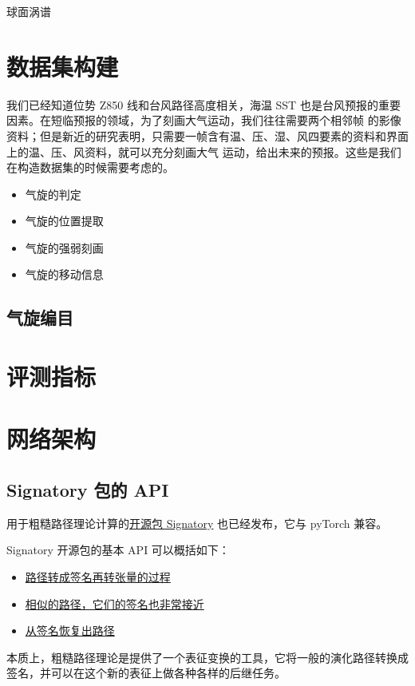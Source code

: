 \documentclass[11pt]{article}
\begin{document}
球面涡谱

\newpage

\section{数据集构建}

我们已经知道位势 Z850 线和台风路径高度相关，海温 SST 也是台风预报的重要因素。在短临预报的领域，为了刻画大气运动，我们往往需要两个相邻帧
的影像资料；但是新近的研究表明\cite{Bi2022Pangu}，只需要一帧含有温、压、湿、风四要素的资料和界面上的温、压、风资料，就可以充分刻画大气
运动，给出未来的预报。这些是我们在构造数据集的时候需要考虑的。

\begin{itemize}
    \item 气旋的判定
    \item 气旋的位置提取
    \item 气旋的强弱刻画
    \item 气旋的移动信息
\end{itemize}


\subsection{气旋编目}

\newpage

\section{评测指标}

\newpage

\section{网络架构}

\subsection{Signatory 包的 API}

用于粗糙路径理论计算的\href{https://github.com/patrick-kidger/signatory}{开源包 Signatory} 也已经发布，它与 pyTorch 兼容。

Signatory 开源包的基本 API 可以概括如下：
\begin{itemize}
\item \href{https://signatory.readthedocs.io/en/latest/pages/examples/neuralnetworks.html}{路径转成签名再转张量的过程}
\item \href{https://signatory.readthedocs.io/en/latest/pages/examples/translation.html}{相似的路径，它们的签名也非常接近}
\item \href{https://signatory.readthedocs.io/en/latest/pages/examples/inversion.html}{从签名恢复出路径}
\end{itemize}

本质上，粗糙路径理论是提供了一个表征变换的工具，它将一般的演化路径转换成签名，并可以在这个新的表征上做各种各样的后继任务。

\newpage
{}
{}


\end{document}
